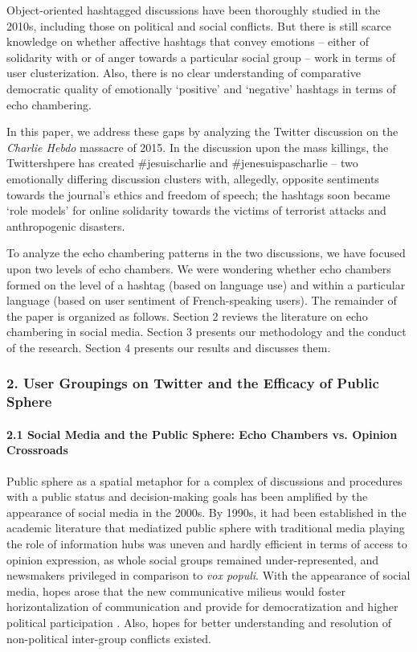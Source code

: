 Object-oriented hashtagged discussions have been thoroughly studied in the 2010s, including those on political and social conflicts. But there is still scarce knowledge on whether affective hashtags \cite{Papacharissi} that convey emotions -- either of solidarity with or of anger towards a particular social group -- work in terms of user clusterization. Also, there is no clear understanding of comparative democratic quality of emotionally ‘positive’ and ‘negative’ hashtags in terms of echo chambering.

In this paper, we address these gaps by analyzing the Twitter discussion on the \textit{Charlie Hebdo} massacre of 2015. In the discussion upon the mass killings, the Twittershpere has created \#jesuischarlie and \#jenesuispascharlie -- two emotionally differing discussion clusters with, allegedly, opposite sentiments towards the journal’s ethics and freedom of speech; the hashtags soon became ‘role models’ for online solidarity towards the victims of terrorist attacks and anthropogenic disasters.

To analyze the echo chambering patterns in the two discussions, we have focused upon two levels of echo chambers. We were wondering whether echo chambers formed on the level of a hashtag (based on language use) and within a particular language (based on user sentiment of French-speaking users).
The remainder of the paper is organized as follows. Section 2 reviews the literature on echo chambering in social media. Section 3 presents our methodology and the conduct of the research. Section 4 presents our results and discusses them.

\subsubsection{2. User Groupings on Twitter and the Efficacy of Public Sphere}

\paragraph{2.1 Social Media and the Public Sphere: Echo Chambers vs. Opinion Crossroads}
Public sphere as a spatial metaphor for a complex of discussions and procedures with a public status and decision-making goals \cite{Kleinstuber} has been amplified by the appearance of social media in the 2000s. By 1990s, it had been established in the academic literature that mediatized public sphere with traditional media playing the role of information hubs was uneven and hardly efficient in terms of access to opinion expression, as whole social groups remained under-represented, and newsmakers privileged in comparison to \textit{vox populi}. With the appearance of social media, hopes arose that the new communicative milieus would foster horizontalization of communication and provide for democratization and higher political participation \cite{Fuchs}. Also, hopes for better understanding and resolution of non-political inter-group conflicts existed.


